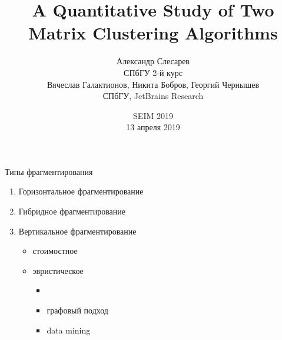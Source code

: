 \documentclass[10pt, dvipsnames]{beamer}
\title{A Quantitative Study of Two Matrix Clustering Algorithms}
\author{{Александр Слесарев}%
		\\
		СПбГУ 2-й курс\\[0.1cm]
		Вячеслав Галактионов,\;%
		Никита Бобров,\;%
		Георгий Чернышев%
		\\
		СПбГУ, JetBrains Research
		}
\date[SEIM 2019]{	SEIM 2019\\ 13 апреля 2019}
\begin{document}
\maketitle

\begin{frame}{Типы фрагментирования}
	\begin{enumerate}
	\item Горизонтальное фрагментирование\newline
	\item Гибридное фрагментирование\newline
	\item Вертикальное фрагментирование\\
		\begin{itemize}
		\item стоимостное 
		\item эвристическое
			\begin{itemize}
			\item \color{red}\uline{\color{black}{методы матричной кластеризации}}\color{black}
			\item графовый подход
			\item data mining 
			\end{itemize} 
		\end{itemize}
	\end{enumerate}
\end{frame}
\end{document}

